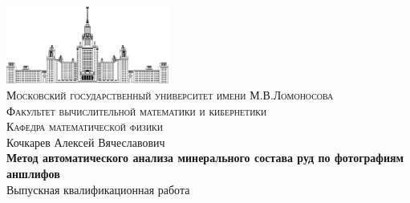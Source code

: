 \begin{titlepage}

\center %

{
\renewcommand{\headrulewidth}{0pt}
}

\thispagestyle{firststyle}



 \includegraphics[width=0.4\textwidth]{./pics/msu_logo}\\[0.2cm] %


\textsc{\small Московский государственный университет имени М.В.Ломоносова}\\ %
\textsc{\small Факультет вычислительной математики и кибернетики}\\ %
\textsc{\small Кафедра математической физики}\\[3cm] %

{
	Кочкарев Алексей Вячеславович
} \\[1cm]
{ \Large \bfseries
	Метод автоматического анализа минерального состава руд по фотографиям аншлифов
} \\[1cm]
{ \Large
	Выпускная квалификационная работа
}\\[2.5cm] %
 


\end{titlepage}
